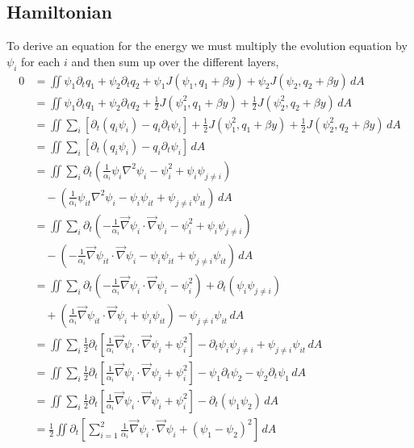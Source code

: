 \documentclass[12pt]{article}
\begin{document}
{    \subsection{Hamiltonian}{
        To derive an equation for the energy we must multiply the evolution equation by $\psi_i$ for each $i$ and then sum up over the different layers,
        \begin{align*}
            0 &= \iint \psi_1 \partial_t q_1 + \psi_2 \partial_t q_2 + \psi_1 J(\psi_1, q_1 + \beta y) + \psi_2 J(\psi_2, q_2 + \beta y) \, dA \\
            &= \iint \psi_1 \partial_t q_1 + \psi_2 \partial_t q_2 + \frac12 J(\psi_1^2, q_1 + \beta y) + \frac12 J(\psi_2^2, q_2 + \beta y) \, dA \\
            &= \iint \sum_i \left[\partial_t(q_i \psi_i) - q_i \partial_t\psi_i \right] + \frac12 J(\psi_1^2, q_1 + \beta y) + \frac12 J(\psi_2^2, q_2 + \beta y) \, dA \\
            &= \iint \sum_i \left[\partial_t(q_i \psi_i) - q_i \partial_t\psi_i \right] \, dA \\
            &= \iint \sum_i \partial_t \left (\frac{1}{\alpha_i}\psi_i \nabla^2 \psi_i - \psi_i^2 + \psi_i\psi_{j\ne i} \right) \\
            &\quad - \left( \frac{1}{\alpha_i} \psi_{it} \nabla^2 \psi_i - \psi_i \psi_{it} + \psi_{j \ne i} \psi_{it} \right) \, dA \\
            &= \iint \sum_i \partial_t \left (-\frac{1}{\alpha_i} \vec\nabla \psi_i \cdot \vec\nabla \psi_i - \psi_i^2 + \psi_i\psi_{j\ne i} \right) \\
            &\quad - \left( -\frac{1}{\alpha_i} \vec\nabla \psi_{it} \cdot \vec\nabla \psi_i - \psi_i \psi_{it} + \psi_{j \ne i} \psi_{it} \right) \, dA \\
            &= \iint \sum_i \partial_t \left (-\frac{1}{\alpha_i} \vec\nabla \psi_i \cdot \vec\nabla \psi_i - \psi_i^2 \right) + \partial_t (\psi_i\psi_{j\ne i})  \\
            &\quad + \left( \frac{1}{\alpha_i} \vec\nabla \psi_{it} \cdot \vec\nabla \psi_i + \psi_i \psi_{it} \right) - \psi_{j \ne i} \psi_{it} \, dA \\
            &= \iint \sum_i \frac12 \partial_t \left[ \frac{1}{\alpha_i} \vec\nabla \psi_i \cdot \vec\nabla \psi_i + \psi_i^2 \right] - \partial_t \psi_i\psi_{j\ne i} + \psi_{j \ne i} \psi_{it} \, dA \\
            &= \iint  \sum_i \frac12 \partial_t \left[ \frac{1}{\alpha_i} \vec\nabla \psi_i \cdot  \vec\nabla \psi_i + \psi_i^2 \right] - \psi_1 \partial_t \psi_2  -  \psi_2 \partial_t \psi_1\, dA \\
            &= \iint  \sum_i \frac12 \partial_t \left[ \frac{1}{\alpha_i} \vec\nabla \psi_i \cdot  \vec\nabla \psi_i + \psi_i^2 \right] -  \partial_t (\psi_1\psi_2)\, dA \\
            &= \frac12 \iint \partial_t \left[ \sum_{i=1}^2 \frac{1}{\alpha_i} \vec\nabla \psi_i \cdot \vec\nabla \psi_i + (\psi_1 - \psi_2)^2 \right]\, dA
        \end{align*}

}}
\end{document}
